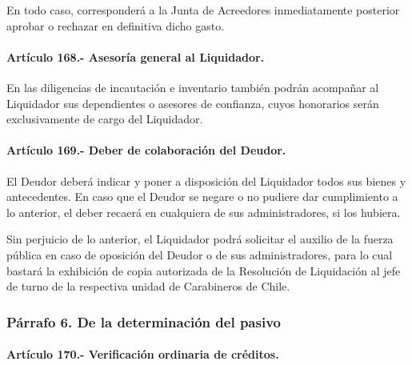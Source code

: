 \documentclass[
]{book}
\begin{document}
En todo caso, corresponderá a la Junta de Acreedores inmediatamente posterior aprobar o rechazar en definitiva dicho gasto.

\hypertarget{artuxedculo-168.--asesoruxeda-general-al-liquidador.}{%
\paragraph*{Artículo 168.- Asesoría general al Liquidador.}\label{artuxedculo-168.--asesoruxeda-general-al-liquidador.}}

En las diligencias de incautación e inventario también podrán acompañar al Liquidador sus dependientes o asesores de confianza, cuyos honorarios serán exclusivamente de cargo del Liquidador.

\hypertarget{artuxedculo-169.--deber-de-colaboraciuxf3n-del-deudor.}{%
\paragraph*{Artículo 169.- Deber de colaboración del Deudor.}\label{artuxedculo-169.--deber-de-colaboraciuxf3n-del-deudor.}}

El Deudor deberá indicar y poner a disposición del Liquidador todos sus bienes y antecedentes. En caso que el Deudor se negare o no pudiere dar cumplimiento a lo anterior, el deber recaerá en cualquiera de sus administradores, si los hubiera.

Sin perjuicio de lo anterior, el Liquidador podrá solicitar el auxilio de la fuerza pública en caso de oposición del Deudor o de sus administradores, para lo cual bastará la exhibición de copia autorizada de la Resolución de Liquidación al jefe de turno de la respectiva unidad de Carabineros de Chile.

\hypertarget{puxe1rrafo-6.-de-la-determinaciuxf3n-del-pasivo}{%
\subsubsection*{Párrafo 6. De la determinación del pasivo}\label{puxe1rrafo-6.-de-la-determinaciuxf3n-del-pasivo}}

\hypertarget{artuxedculo-170.--verificaciuxf3n-ordinaria-de-cruxe9ditos.}{%
\paragraph*{Artículo 170.- Verificación ordinaria de créditos.}\label{artuxedculo-170.--verificaciuxf3n-ordinaria-de-cruxe9ditos.}}
\end{document}
